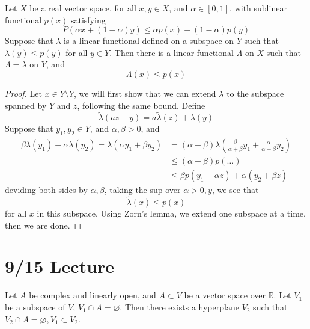 \documentclass[openany]{book}
\newcommand{\R}{\mathbb{R}}
\let\emptyset\varnothing
\begin{document}
\begin{prop}
    Let $X$ be a real vector space, for all $x,y\in X$, and $\alpha\in[0,1]$, with sublinear functional $p(x)$ satisfying 
    \begin{equation*}
        P(\alpha x+(1-\alpha)y)\leq\alpha p(x)+(1-\alpha)p(y)
    \end{equation*}
    Suppose that $\lambda$ is a linear functional  defined on a subspace on $Y$ such that $\lambda(y)\leq p(y)$ for all $y\in Y$. Then there is a linear functional $\Lambda$ on $X$ such that $\Lambda=\lambda$ on $Y$, and 
    \begin{equation*}
        \Lambda(x)\leq p(x)
    \end{equation*}
\end{prop}
\begin{proof}
    Let $x\in Y\setminus Y$, we will first show that we can extend $\lambda$ to the subspace spanned by $Y$ and $z$, following the same bound. Define 
    \begin{equation*}
        \tilde{\lambda}(az+y)=a\tilde{\lambda}(z)+\lambda(y)
    \end{equation*}
    Suppose that $y_1,y_2\in Y$, and $\alpha,\beta>0$, and 
    \begin{align*}
        \beta\lambda(y_1)+\alpha\lambda(y_2)=\lambda(\alpha y_1+\beta y_2)&=(\alpha+\beta)\lambda\left(\frac{\beta}{\alpha+\beta}y_1+\frac{\alpha}{\alpha+\beta}y_2\right)\\
        &\leq(\alpha+\beta)p(\dots)\\
        &\leq\beta p(y_1-\alpha z)+\alpha(y_2+\beta z)
    \end{align*}
    deviding both sides by $\alpha,\beta$, taking the sup over $\alpha>0, y$, we see that 
    \begin{equation*}
        \tilde{\lambda}(x)\leq p(x)
    \end{equation*}
    for all $x$ in this subspace. Using Zorn's lemma, we extend one subspace at a time, then we are done.
\end{proof}




\section{9/15 Lecture}
\begin{prop}
    Let $A$ be complex and linearly open, and $A\subset V$ be a vector space over $\R$. Let $V_1$ be a subspace of $V$, $V_1\cap A=\emptyset$. Then there exists a hyperplane $V_2$ such that $V_2\cap A=\emptyset, V_1\subset V_2$. 
\end{prop}
\end{document}
